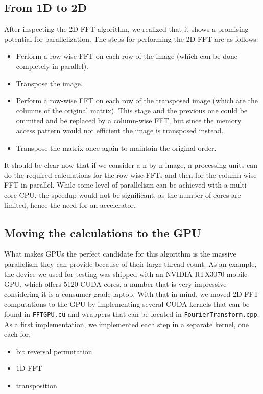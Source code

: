 \subsection{From 1D to 2D}
After inspecting the 2D FFT algorithm, we realized that it shows a promising potential for parallelization. The steps for performing the 2D FFT are as follows: 
\begin{itemize}
    \item Perform a row-wise FFT on each row of the image (which can be done completely in parallel).
    \item Transpose the image.
    \item Perform a row-wise FFT on each row of the transposed image (which are the columns of the original matrix). This stage and the previous one could be ommited and be replaced by a column-wise FFT, but since the memory access pattern would not efficient the image is transposed instead.
    \item Transpose the matrix once again to maintain the original order.
\end{itemize}
It should be clear now that if we consider a n by n image, n processing units can do the required calculations for the row-wise FFTs and then for the column-wise FFT in parallel. While some level of parallelism can be achieved with a multi-core CPU, the speedup would not be significant, as the number of cores are limited, hence the need for an accelerator.

\subsection{Moving the calculations to the GPU}
What makes GPUs the perfect candidate for this algorithm is the massive parallelism they can provide because of their large thread count. As an example, the device we used for testing was shipped with an NVIDIA RTX3070 mobile GPU, which offers 5120 CUDA cores, a number that is very impressive considering it is a consumer-grade laptop. With that in mind, we moved 2D FFT computations to the GPU by implementing several CUDA kernels that can be found in \texttt{FFTGPU.cu} and wrappers that can be located in \texttt{FourierTransform.cpp}.
As a first implementation, we implemented each step in a separate kernel, one each for:
\begin{itemize}
    \item bit reversal permutation
    \item 1D FFT
    \item transposition
\end{itemize}

